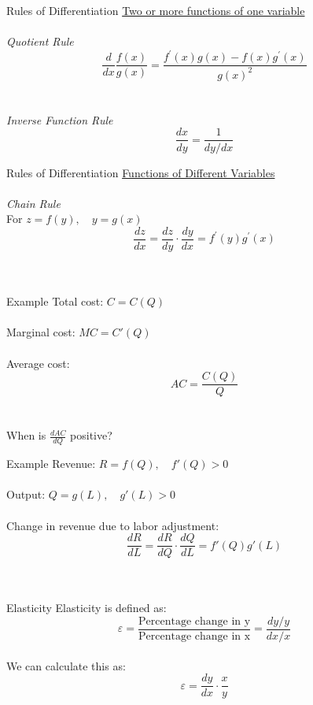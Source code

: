 \documentclass{./../../Latex/teaching_slides}
\begin{document}
\begin{frame}{Rules of Differentiation}
\underline{Two or more functions of one variable} \\~\\ 
\textit{Quotient Rule}\\
$$ \frac{d}{d x} \frac{f(x)}{g(x)}=\frac{f^{\prime}(x) g(x)-f(x) g^{\prime}(x)}{g(x)^2} $$\\~\\
\textit{Inverse Function Rule}
$$
\frac{d x}{d y}=\frac{1}{d y / d x}
$$

\end{frame}


\begin{frame}{Rules of Differentiation}
\underline{Functions of Different Variables} \\~\\
\textit{Chain Rule} \\
\vspace{0.5em}
For \( z=f(y), \quad y=g(x) \)
$$ \frac{d z}{d x}=\frac{d z}{d y} \cdot \frac{d y}{d x}=f^{\prime}(y) g^{\prime}(x) $$ \\~\\
\end{frame}


\begin{frame}{Example}
Total cost: $C=C(Q)$ \\~\\
Marginal cost: $MC = C'(Q)$ \\~\\
Average cost:
$$ AC = \frac{C(Q)}{Q} $$ \\~\\
When is $ \frac{d AC}{d Q} $ positive?
\end{frame}


\begin{frame}{Example}
Revenue: $R=f(Q), \quad f'(Q)>0$ \\~\\
Output: $Q = g(L), \quad g'(L)>0$ \\~\\
Change in revenue due to labor adjustment:
$$ \frac{d R}{d L} = \frac{d R}{d Q} \cdot \frac{d Q}{d L} = f'(Q) g'(L) $$ \\~\\
\end{frame}

\begin{frame}{Elasticity}
Elasticity is defined as:
\[ \varepsilon = \frac{\text{Percentage change in y}}{\text{Percentage change in x}} = \frac{dy/y}{dx/x} \] \\

We can calculate this as:
\[ \varepsilon = \frac{dy}{dx} \cdot \frac{x}{y} \]
\end{frame}
\end{document}
